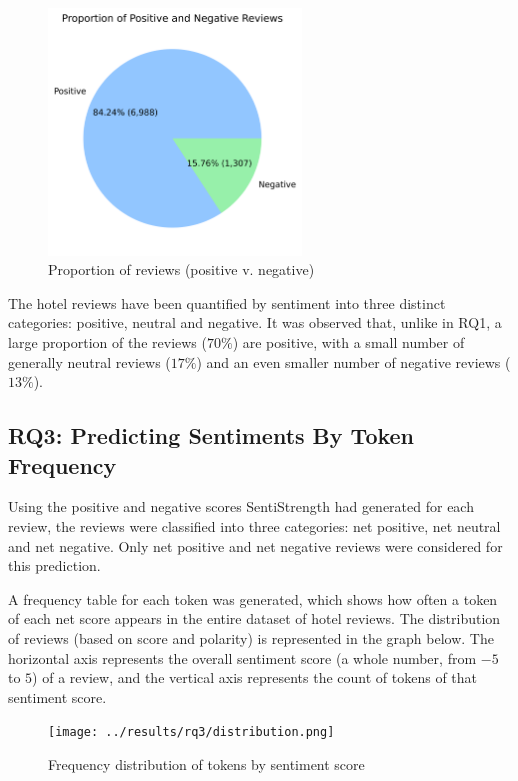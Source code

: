 \documentclass[12pt, bibliography=totocnumbered, a4paper]{scrartcl}
\begin{document}
\begin{figure}[htpb]
	\begin{center}
		\includegraphics[width=0.6\textwidth]{../results/rq2/pie_chart_2part.png}
	\end{center}
	\caption{Proportion of reviews (positive v. negative)}
	\label{fig:reviews-pie4}
\end{figure}

The hotel reviews have been quantified by sentiment into three distinct categories:
positive, neutral and negative. It was observed that, unlike in RQ1, a large proportion
of the reviews (\(70\%\)) are positive, with a small number of generally neutral reviews (\(17\%\))
and an even smaller number of negative reviews (\(13\%\)).

\subsection{RQ3: Predicting Sentiments By Token Frequency}
Using the positive and negative scores SentiStrength had generated for
each review, the reviews were classified into three categories: net positive,
net neutral and net negative. Only net positive and net negative reviews were
considered for this prediction.

A frequency table for each token was generated, which shows
how often a token of each net score appears in the entire dataset
of hotel reviews. The distribution of reviews (based on score and
polarity) is represented in the graph below. The horizontal axis represents
the overall sentiment score (a whole number, from \(-5\) to \(5\)) of a review,
and the vertical axis represents the count of tokens of that sentiment score.

\begin{figure}[htpb]
	\begin{center}
		\texttt{[image: ../results/rq3/distribution.png]}
	\end{center}
	\caption{Frequency distribution of tokens by sentiment score}
	\label{fig:hist}
\end{figure}
\end{document}
